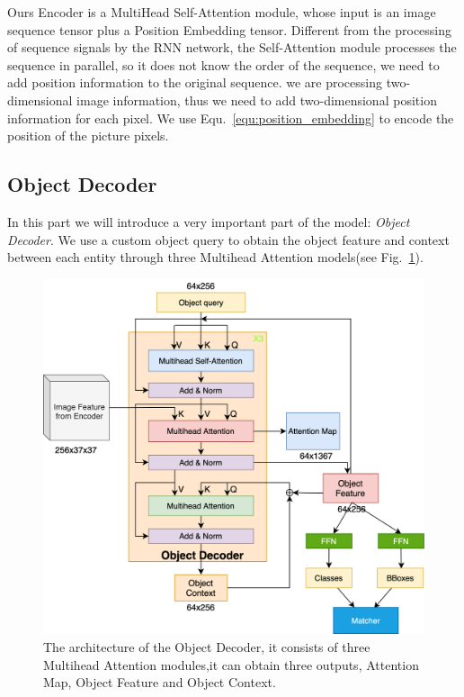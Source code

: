 Ours Encoder is a MultiHead Self-Attention module, whose input is an image sequence tensor plus a  Position Embedding tensor. Different from the processing of sequence signals by the RNN network, the Self-Attention module processes the sequence in parallel, so it does not know the order of the sequence, we need to add position information to the original sequence.  we are processing two-dimensional image information, thus we need to add two-dimensional position information for each pixel. We use Equ.~\ref{equ:position_embedding} to encode the position of the picture pixels.


\subsection{Object Decoder }

In this part we will introduce a very important part of the model: \textit{Object Decoder}. We use a custom object query to obtain the object feature and context between each entity through three Multihead Attention models(see Fig.~\ref{fig:objectdecoder}).

\begin{figure}[tbph!]
	\centering
	\includegraphics[width=0.9\linewidth]{figures/object_decoder}
	\caption[Illustration of the Object Decoder]{The architecture of the Object Decoder, it consists of three Multihead Attention modules,it can obtain three outputs, Attention Map, Object Feature and Object Context.}
	\label{fig:objectdecoder}
\end{figure}


